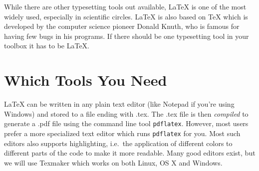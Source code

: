 

While there are other typesetting tools out available, \LaTeX{} is one of the most widely used, especially in scientific circles. \LaTeX{} is also based on \TeX{} which is developed by the computer science pioneer Donald Knuth, who is famous for having few bugs in his programs. If there should be one typesetting tool in your toolbox it has to be \LaTeX{}.


\section{Which Tools You Need}
\LaTeX{} can be written in any plain text editor (like Notepad if you're using Windows) and stored to a file ending with .tex. The .tex file is then \emph{compiled} to generate a .pdf file using the command line tool \verb|pdflatex|. However, most users prefer a more specialized text editor which runs \verb|pdflatex| for you. Most such editors also supports highlighting, i.e.\ the application of different colors to different parts of the code to make it more readable. Many good editors exist, but we will use Texmaker which works on both Linux, OS X and Windows.

